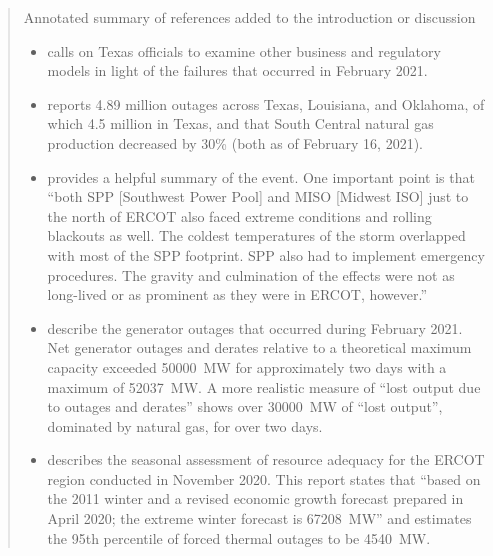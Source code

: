\documentclass{ar2rc}
\begin{document}
\begin{quote}
  Annotated summary of references added to the introduction or discussion
  \begin{itemize}
    \item \citet{cartwright_lightsout:2021} calls on Texas officials to examine other business and regulatory models in light of the failures that occurred in February 2021.
    \item \citet{ceser_winterupdate:2021} reports 4.89 million outages across Texas, Louisiana, and Oklahoma, of which 4.5 million in Texas, and that South Central natural gas production decreased by 30\% (both as of February 16, 2021).
    \item \citet{clack_uri:2021} provides a helpful summary of the event. One important point is that ``both SPP [Southwest Power Pool] and MISO [Midwest ISO] just to the north of ERCOT also faced extreme conditions and rolling blackouts as well. The coldest temperatures of the storm overlapped with most of the SPP footprint. SPP also had to implement emergency procedures. The gravity and culmination of the effects were not as long-lived or as prominent as they were in ERCOT, however.''
    \item \citet{ercotpublic_outagesv1:2021,ercotpublic_outagesv2:2021} describe the generator outages that occurred during February 2021. Net generator outages and derates relative to a theoretical maximum capacity exceeded \SI{50000}{\mega\watt} for approximately two days with a maximum of \SI{52037}{\mega\watt}. A more realistic measure of ``lost output due to outages and derates'' shows over \SI{30000}{\mega\watt} of ``lost output'', dominated by natural gas, for over two days.
    \item \citet{ercotpublic_sarawinter:2020} describes the seasonal assessment of resource adequacy for the ERCOT region conducted in November 2020. This report states that ``based on the 2011 winter and a revised economic growth forecast prepared in April 2020; the extreme winter forecast is \SI{67208}{\mega\watt}'' and estimates the 95th percentile of forced thermal outages to be \SI{4540}{\mega\watt}.

\end{itemize}
\end{quote}
\end{document}
